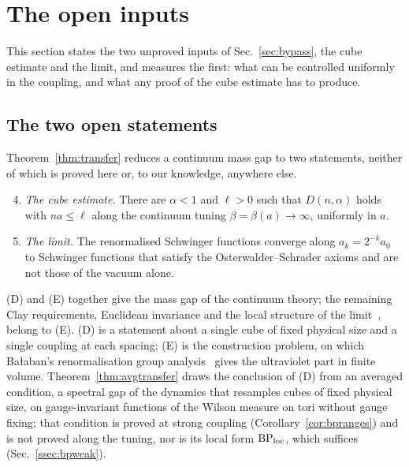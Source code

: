\documentclass[aps,prd,twocolumn,superscriptaddress,nofootinbib,longbibliography,floatfix,amsmath,amssymb,10pt]{revtex4-2}
\theoremstyle{definition}
\theoremstyle{remark}
\begin{document}
\section{The open inputs}\label{sec:inputs}



This section states the two unproved inputs of Sec.~\ref{sec:bypass}, the cube
estimate and the limit, and measures the first: what can be controlled
uniformly in the coupling, and what any proof of the cube estimate has to
produce.

\subsection{The two open statements}

Theorem~\ref{thm:transfer} reduces a continuum mass gap to two statements,
neither of which is proved here or, to our knowledge, anywhere else.
\begin{enumerate}[label=\textup{(\Alph*)},leftmargin=*]
\setcounter{enumi}{3}
\item \emph{The cube estimate.} There are $\alpha<1$ and $\ell>0$ such that
$D(n,\alpha)$ holds with $na\le\ell$ along the continuum tuning
$\beta=\beta(a)\to\infty$, uniformly in $a$.
\item \emph{The limit.} The renormalised Schwinger functions converge along
$a_k=2^{-k}a_0$ to Schwinger functions that satisfy the
Osterwalder--Schrader axioms and are not those of the vacuum alone.
\end{enumerate}
(D) and (E) together give the mass gap of the continuum theory; the
remaining Clay requirements, Euclidean invariance and the local structure of
the limit~\cite{JW06}, belong to (E). (D) is a statement about a single
cube of fixed physical size and a single coupling at each spacing; (E) is the
construction problem, on which Ba{\l}aban's renormalisation group
analysis~\cite{Bal84a,Bal85a,Bal89b} gives the ultraviolet part in finite
volume. Theorem~\ref{thm:avgtransfer} draws the conclusion of (D) from an
averaged condition, a spectral gap of the dynamics that resamples cubes of
fixed physical size, on gauge-invariant functions of the Wilson measure on
tori without gauge fixing; that condition is proved at strong coupling
(Corollary~\ref{cor:bpranges}) and is not proved along the tuning, nor is its
local form $\mathrm{BP}_{\rm loc}$, which suffices
(Sec.~\ref{ssec:bpweak}).
\end{document}
